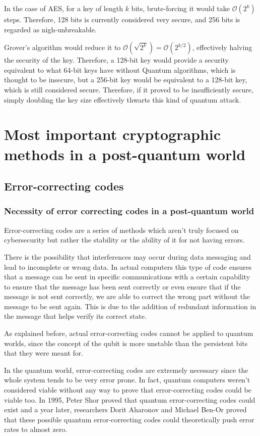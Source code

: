 In the case of AES, for a key of length $k$ bits, brute-forcing it would take
$\mathcal{O}(2^k)$ steps. Therefore, 128 bits is currently considered very
secure, and 256 bits is regarded as nigh-unbreakable.

Grover's algorithm would reduce it to $\mathcal{O}\left(\sqrt{2^k}\right) =
\mathcal{O}\left({2^{k/2}}\right) $, effectively halving the security of the
key. Therefore, a 128-bit key would provide a security equivalent to what 64-bit
keys have without Quantum algorithms, which is thought to be insecure, but a
256-bit key would be equivalent to a 128-bit key, which is still considered
secure. Therefore, if it proved to be insufficiently secure, simply doubling the
key size effectively thwarts this kind of quantum attack.


\pagebreak
\section{Most important cryptographic methods in a post-quantum world}

\subsection{Error-correcting codes}
\subsubsection{Necessity of error correcting codes in a post-quantum world}

Error-correcting codes are a series of methods which aren't truly focused on
cybersecurity but rather the stability or the ability of it for not having
errors.

There is the possibility that interferences may occur during data messaging and
lead to incomplete or wrong data. In actual computers this type of code ensures
that a message can be sent in specific communications with a certain capability
to ensure that the message has been sent correctly or even ensure that if the
message is not sent correctly, we are able to correct the wrong part without the
message to be sent again. This is due to the addition of redundant information
in the message that helps verify its correct state.

As explained before, actual error-correcting codes cannot be applied to quantum
worlds, since the concept of the qubit is more unstable than the persistent bits
that they were meant for.

In the quantum world, error-correcting codes are extremely necessary since the
whole system tends to be very error prone. In fact, quantum computers weren't
considered viable without any way to prove that error-correcting codes could be
viable too. In 1995, Peter Shor proved that quantum error-correcting codes could
exist and a year later, researchers Dorit Aharonov and Michael Ben-Or proved
that these possible quantum error-correcting codes could theoretically push
error rates to almost zero. \cite{wolchover_how_nodate}

